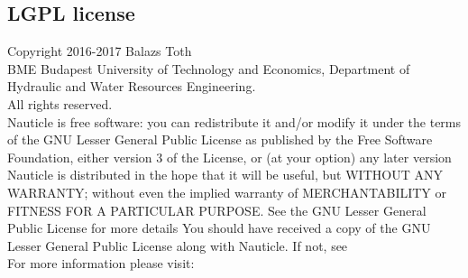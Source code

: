 \documentclass[a4paper,12pt,openany]{book}
\newcommand{\myhref}[3][nauticlegreen_dark]{\href{#2}{\color{#1}{#3}}}%
\theoremstyle{break}
\begin{document}
\subsection{LGPL license}
\noindent
Copyright \textcopyright{} 2016-2017 Balazs Toth \\
\noindent
BME Budapest University of Technology and Economics, Department of Hydraulic and Water Resources Engineering.\\
All rights reserved. \\
Nauticle is free software: you can redistribute it and/or modify it under the terms of the GNU Lesser General Public License as published by the Free Software Foundation, either version 3 of the License, or (at your option) any later version Nauticle is distributed in the hope that it will be useful, but WITHOUT ANY WARRANTY; without even the implied warranty of MERCHANTABILITY or FITNESS FOR A PARTICULAR PURPOSE.  See the GNU Lesser General Public License for more details You should have received a copy of the GNU Lesser General Public License along with Nauticle.  If not, see \myhref{http://www.gnu.org/licenses/}{http://www.gnu.org/licenses/}\\
 For more information please visit: \myhref{https://bitbucket.org/Nauticleproject/}{https://bitbucket.org/Nauticleproject/}
\end{document}
